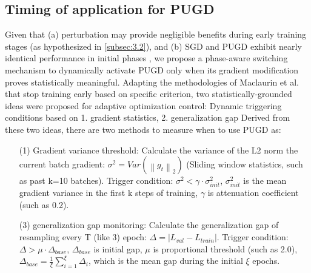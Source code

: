 \documentclass[10pt,twocolumn,letterpaper]{article}
\begin{document}
\subsection{Timing of application for PUGD}
\label{subsec:3.3}
Given that (a) perturbation may provide negligible benefits during early training stages (as hypothesized in \ref{subsec:3.2}), and (b) SGD and PUGD exhibit nearly identical performance in initial phases , we propose a phase-aware switching mechanism to dynamically activate PUGD only when its gradient modification proves statistically meaningful. Adapting the methodologies of Maclaurin et al. \cite{maclaurin2015earlystoppingnonparametricvariational} that stop training early based on specific criterion, two statistically-grounded ideas were proposed for adaptive optimization control: Dynamic triggering conditions based on 1. gradient statistics, 2. generalization gap
Derived from these two ideas, there are two methods to measure when to use PUGD as:
\begin{enumerate}
    \item[(1)] Gradient variance threshold: Calculate the variance of the L2 norm the current batch gradient: $\sigma ^{2} = Var(\left \|g_{t} \right \|_{2})$ (Sliding window statistics, such as past k=10 batches).
	Trigger condition: $\sigma ^{2} < \gamma \cdot  \sigma ^{2}_{init}$, $\sigma ^{2}_{init}$ is the mean gradient variance in the first k steps of training, $\gamma$ is attenuation coefficient (such as 0.2).
	\item[(3)] generalization gap monitoring: Calculate the generalization gap of resampling every T (like 3) epoch: $ \Delta = \left | L_{val} - L_{train} \right |$.
	Trigger condition: $\Delta > \mu \cdot \Delta _{base}$, $\Delta _{base}$ is initial gap, $\mu$ is proportional threshold (such as 2.0), $\Delta _{base} = \frac{1}{\xi} \sum_{i=1}^{\xi} \Delta _{i}$, which is the mean gap during the initial $\xi$ epochs. 
\end{enumerate}
\end{document}
